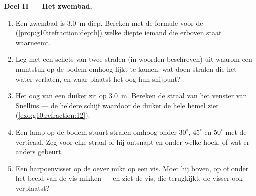 \begin{problem}
\medskip
\noindent\textbf{Deel II --- Het zwembad.}
\begin{enumerate}[resume]
  \item Een zwembad is \qty{3.0}{m} diep. Bereken met de formule voor de
         (\cref{prop:g10:refraction:depth}) welke diepte
        iemand die erboven staat waarneemt.
  \item Leg met een schets van twee stralen (in woorden beschreven) uit
        waarom een muntstuk op de bodem omhoog lijkt te komen: wat doen
        stralen die het water verlaten, en waar plaatst het oog hun
        snijpunt?
  \item Het oog van een duiker zit op \qty{3.0}{m}. Bereken de straal van
        het venster van Snellius --- de heldere schijf waardoor de duiker
        de hele hemel ziet (\cref{exo:g10:refraction:12}).
  \item Een lamp op de bodem stuurt stralen omhoog onder $30^\circ$,
        $45^\circ$ en $50^\circ$ met de verticaal. Zeg voor elke straal
        of hij ontsnapt en onder welke hoek, of wat er anders gebeurt.
  \item Een harpoenvisser op de oever mikt op een vis. Moet hij boven,
        op of onder het beeld van de vis mikken --- en ziet de vis, die
        terugkijkt, de visser ook verplaatst?
\end{enumerate}


\end{problem}
